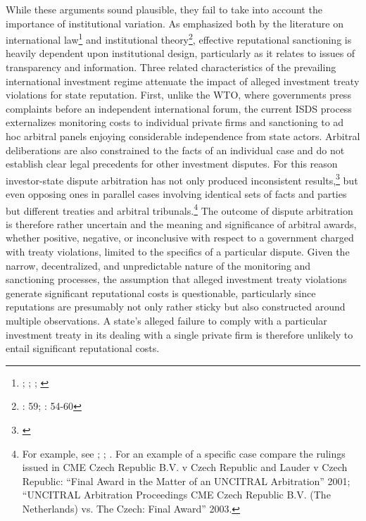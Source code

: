 \documentclass[12pt,onesided]{amsart}
\begin{document}
While these arguments sound plausible, they fail to take into account the importance of institutional variation. As emphasized both by the literature on international law\footnote{\citet{staton2011judicial}; \citet{cavallaro2008reevaluating}; \citet{guzman2008reputation}; \citet{guzman2008international}} and institutional theory\footnote{\citet{knight1992institutions}: 59; \citet{north1990institutions}: 54-60}, effective reputational sanctioning is heavily dependent upon institutional design, particularly as it relates to issues of transparency and information. Three related characteristics of the prevailing international investment regime attenuate the impact of alleged investment treaty violations for state reputation. First, unlike the WTO, where governments press complaints before an independent international forum, the current ISDS process externalizes monitoring costs to individual private firms and sanctioning to ad hoc arbitral panels enjoying considerable independence from state actors. Arbitral deliberations are also constrained to the facts of an individual case and do not establish clear legal precedents for other investment disputes. For this reason investor-state dispute arbitration has not only produced inconsistent results,\footnote{\citet{franck:2005}} but even opposing ones in parallel cases involving identical sets of facts and parties but different treaties and arbitral tribunals.\footnote{For example, see \citet{franck:2005}; \citet{kim2011annulment}; \citet{egli2006don}. For an example of a specific case compare the rulings issued in CME Czech Republic B.V. v Czech Republic and Lauder v Czech Republic: ``Final Award in the Matter of an UNCITRAL Arbitration'' 2001; ``UNCITRAL Arbitration Proceedings CME Czech Republic B.V. (The Netherlands) vs. The Czech: Final Award'' 2003.} The outcome of dispute arbitration is therefore rather uncertain and the meaning and significance of arbitral awards, whether positive, negative, or inconclusive with respect to a government charged with treaty violations, limited to the specifics of a particular dispute. Given the narrow, decentralized, and unpredictable nature of the monitoring and sanctioning processes, the assumption that alleged investment treaty violations generate significant reputational costs is questionable, particularly since reputations are presumably not only rather sticky but also constructed around multiple observations. A state's alleged failure to comply with a particular investment treaty in its dealing with a single private firm is therefore unlikely to entail significant reputational costs.
\end{document}
